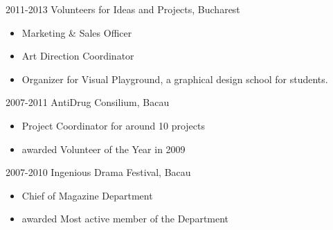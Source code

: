 \documentclass[]{friggeri-cv}
\begin{document}
\begin{entrylist}
  \entry
  {2011-2013}
  {Volunteers for Ideas and Projects, Bucharest}
  {}
  {\begin{itemize}
  \item Marketing \& Sales Officer
  \item Art Direction Coordinator
  \item Organizer for Visual Playground, a graphical design school for students.
  \end{itemize}}

  \entry
  {2007-2011}
  {AntiDrug Consilium, Bacau}
  {}
  {\begin{itemize}
    \item Project Coordinator for around 10 projects
    \item awarded Volunteer of the Year in 2009
  \end{itemize}}
  
  \entry
  {2007-2010}
  {Ingenious Drama Festival, Bacau}
  {}
  {\begin{itemize}
    \item Chief of Magazine Department
    \item awarded Most active member of the Department
  \end{itemize}}

\end{entrylist}
\end{document}
